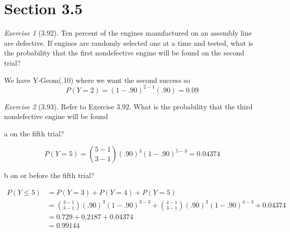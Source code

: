 \documentclass[12pt]{amsart}
\makeatletter
\theoremstyle{remark}
\newtheorem*{exercise}{Exercise}%
\renewenvironment{proof}[1][\proofname]{\par\doublespacing
  \pushQED{\qed}%
  \normalfont \topsep6\p@\@plus6\p@\relax
  \list{}{%
    \settowidth{\leftmargin}{\itshape\proofname:\hskip\labelsep}%
    \setlength{\labelwidth}{0pt}%
    \setlength{\itemindent}{-\leftmargin}%
  }%
  \item[\hskip\labelsep\itshape#1\@addpunct{:}]\ignorespaces
}{%
  \popQED\endlist\@endpefalse
  \singlespacing
}
\theoremstyle{mycomment}
\makeatother
\begin{document}
\thispagestyle{fancy}
\section*{Section 3.5} 



\begin{exercise}[3.92] Ten percent of the engines manufactured on an assembly line are defective. If engines are
randomly selected one at a time and tested, what is the probability that the first nondefective
engine will be found on the second trial?
\begin{proof}[Solution]
We have Y-Geom(.10) where we want the second success so
$$P(Y=2) = (1-.90)^{2-1}(.90) = 0.09$$
\end{proof}
\end{exercise}

\begin{exercise}[3.93] Refer to Exercise 3.92. What is the probability that the third nondefective engine will be found\newline

  a on the fifth trial?
\begin{proof}[Solution]

  $$P(Y=5)={5-1 \choose 3-1}(.90)^3(1-.90)^{5-3} = 0.04374$$
\end{proof}

b
on or before the fifth trial?
\begin{proof}[Solution]
  \begin{align*}
  P(Y \leq 5) &= P(Y = 3) + P(Y=4) + P(Y=5) \\
              &= {3-1 \choose 3-1}(.90)^3(1-.90)^{3-3} + {4-1 \choose 3-1}(.90)^3(1-.90)^{4-3} + 0.04374 \\
              &= 0.729 + 0.2187 + 0.04374 \\
              &= 0.99144
\end{align*}
\end{proof}
\end{exercise}
\end{document}
